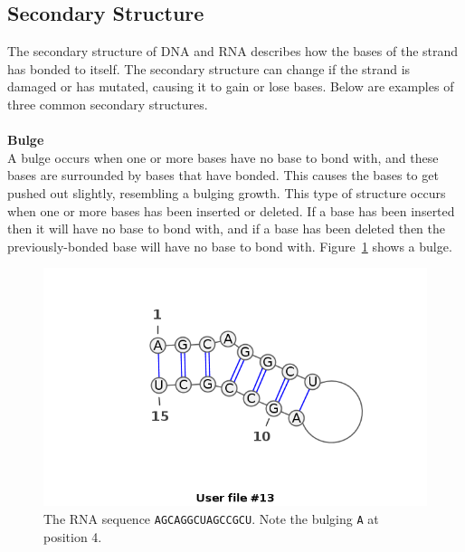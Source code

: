 \subsection{Secondary Structure}\label{structs}
The secondary structure of DNA and RNA describes how the bases of the 
strand has bonded to itself. The secondary structure can change if 
the strand is damaged or has mutated, causing it to gain or lose 
bases. Below are examples of three common secondary structures.\\\\
\textbf{Bulge}\\ 
A bulge occurs when one or more bases have no base to bond with, and these 
bases are surrounded by bases that have bonded. This causes the bases to get 
pushed out slightly, resembling a bulging growth. This type of structure occurs 
when one or more bases has been inserted or deleted. If a base has been 
inserted then it will have no base to bond with, and if a base has been deleted 
then the previously-bonded base will have no base to bond with. Figure~\ref{fig:bulge} shows a bulge.

\begin{figure}[H]
\centering
\includegraphics[scale=0.4]{./lib/bulge.png}
\caption{The RNA sequence {\tt AGCAGGCUAGCCGCU}. Note the bulging {\tt A} at position 4.}
\label{fig:bulge}
\end{figure}~
\\
